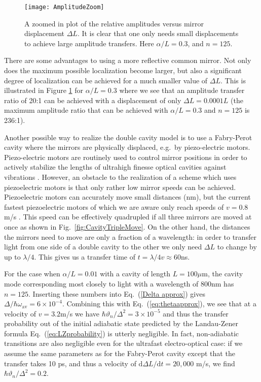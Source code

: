 \documentclass[twocolumn,english,pra,aps,superscriptaddress,floatfix]{revtex4-1}
\begin{document}
\begin{figure}
\texttt{[image: AmplitudeZoom]}
\caption{A zoomed in plot of the relative amplitudes versus mirror displacement $\Delta L$.  It is clear that one only needs small displacements to achieve
large amplitude transfers.  Here $\alpha/L=0.3$, and $n=125$.}
\label{fig:B/Azoom}
\end{figure}


There are some advantages to using a  more reflective common mirror. Not only does the maximum possible localization become larger, but also a significant degree of localization can be achieved for a much smaller value of $
\Delta L$.  This is illustrated in Figure \ref{fig:B/Azoom} for $\alpha/L=0.3$ where we see that an amplitude transfer ratio of 20:1 can be achieved with a displacement of only  $\Delta L=0.0001 L$ (the maximum amplitude ratio that can be achieved with $\alpha/L=0.3$ and $n=125$ is 236:1).

Another possible way to realize the double cavity model is to use a Fabry-Perot cavity where the mirrors are physically displaced, e.g.\ by piezo-electric motors. Piezo-electric motors are routinely used to control mirror positions in order to actively stabilize the lengths of ultrahigh finesse optical cavities against vibrations \cite{ottl06}. 
However, an obstacle to the realization of a scheme which uses piezoelectric motors is that only rather low mirror speeds can be achieved. Piezoelectric motors can accurately move small distances (nm), but the current fastest piezoelectric motors of which we are aware only reach speeds of $v=0.8$m/s \cite{PI}. This speed can be effectively quadrupled if all three mirrors are moved at once as shown in Fig.\ \ref{fig:CavityTripleMove}. On the other hand, the distances the mirrors need to move are only a fraction of a wavelength: in order to transfer light from one side of a double cavity to the other we only need $\Delta L$ to change by up to $\lambda/4$. This gives us a transfer time of $t=\lambda/4v \approx 60$ns. 

For the case when $\alpha/L=0.01$ with a cavity of length $L=100 \mu$m, the cavity mode corresponding most closely to light with a wavelength of $800$nm has $n = 125$.
Inserting these numbers into Eq.\ (\ref{Delta approx})  gives $\Delta/\hbar \omega_{\mathrm{av}} =6 \times 10^{-4} $. Combining this with Eq.\ (\ref{eq:thetaapprox}), we see that at a velocity of $v=3.2$m/s we have $\hbar \vartheta_{n} / \Delta^2=3 \times 10^{-5}$ and thus the transfer probability out of the initial adiabatic state predicted by the Landau-Zener formula Eq.\ (\ref{eq:LZprobability}) is utterly negligible. In fact, non-adiabatic transitions are also negligible even for the ultrafast electro-optical case: if we assume the same parameters  as for the Fabry-Perot cavity except that the transfer takes 10 ps, and thus a velocity of $\mathrm{d} \Delta L / \mathrm{d} t = 20,000$ m/s, we find  $\hbar \vartheta_{n} / \Delta^2=0.2$.
 
\end{document}
